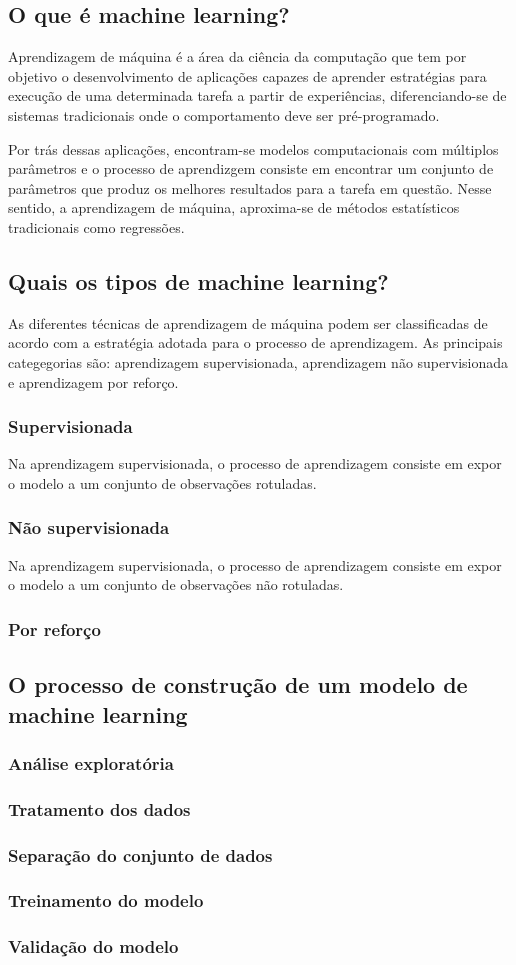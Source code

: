 \subsection{O que é machine learning?}

Aprendizagem de máquina é a área da ciência da computação que tem por objetivo o desenvolvimento
de aplicações capazes de aprender estratégias para execução de uma determinada tarefa a partir de
experiências, diferenciando-se de sistemas tradicionais onde o comportamento deve ser pré-programado.

Por trás dessas aplicações, encontram-se modelos computacionais com múltiplos parâmetros e o processo de
aprendizgem consiste em encontrar um conjunto de parâmetros que produz os melhores resultados para a tarefa
em questão. Nesse sentido, a aprendizagem de máquina, aproxima-se de métodos estatísticos tradicionais como
regressões.

\subsection{Quais os tipos de machine learning?}
As diferentes técnicas de aprendizagem de máquina podem ser classificadas de acordo com a estratégia adotada
para o processo de aprendizagem. As principais categegorias são: aprendizagem supervisionada, aprendizagem não
supervisionada e aprendizagem por reforço.

\subsubsection{Supervisionada}
Na aprendizagem supervisionada, o processo de aprendizagem consiste em expor o modelo a um conjunto de observações
rotuladas.

\subsubsection{Não supervisionada}
Na aprendizagem supervisionada, o processo de aprendizagem consiste em expor o modelo a um conjunto de observações
não rotuladas.

\subsubsection{Por reforço}

\subsection{O processo de construção de um modelo de machine learning}
\subsubsection{Análise exploratória}
\subsubsection{Tratamento dos dados}
\subsubsection{Separação do conjunto de dados}
\subsubsection{Treinamento do modelo}
\subsubsection{Validação do modelo}
